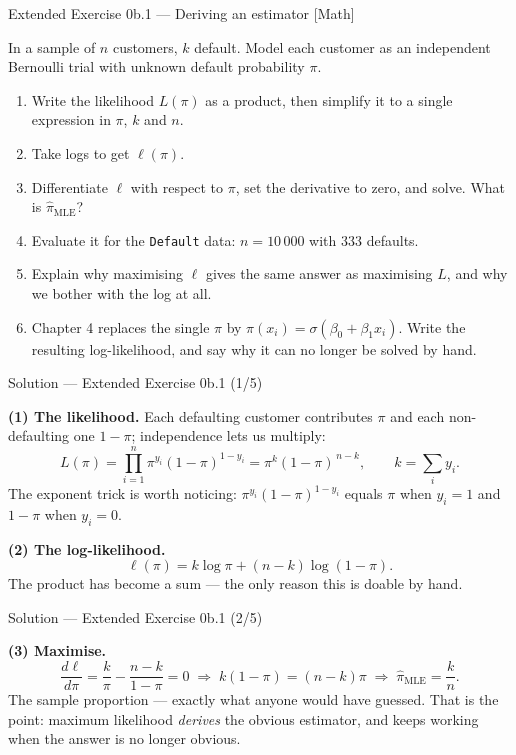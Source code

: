 \documentclass[aspectratio=169,11pt]{beamer}
\begin{document}
\begin{frame}{Extended Exercise 0b.1 --- Deriving an estimator [Math]}
  \begin{longexercise}
    In a sample of $n$ customers, $k$ default. Model each customer as an
    independent Bernoulli trial with unknown default probability $\pi$.
    \begin{enumerate}
      \item Write the likelihood $L(\pi)$ as a product, then simplify it to a
            single expression in $\pi$, $k$ and $n$.
      \item Take logs to get $\ell(\pi)$.
      \item Differentiate $\ell$ with respect to $\pi$, set the derivative to
            zero, and solve. What is $\hat\pi_{\mathrm{MLE}}$?
      \item Evaluate it for the \texttt{Default} data: $n = 10\,000$ with
            $333$ defaults.
      \item Explain why maximising $\ell$ gives the same answer as maximising
            $L$, and why we bother with the log at all.
      \item Chapter 4 replaces the single $\pi$ by
            $\pi(x_i) = \sigma(\beta_0 + \beta_1 x_i)$. Write the resulting
            log-likelihood, and say why it can no longer be solved by hand.
    \end{enumerate}
  \end{longexercise}
\end{frame}

\begin{frame}{Solution --- Extended Exercise 0b.1 (1/5)}
  \begin{solutionbox}
    \textbf{(1) The likelihood.} Each defaulting customer contributes $\pi$ and
    each non-defaulting one $1-\pi$; independence lets us multiply:
    \[
      L(\pi) = \prod_{i=1}^{n} \pi^{y_i}(1-\pi)^{1-y_i}
             = \pi^{k}(1-\pi)^{\,n-k},
      \qquad k = \sum_i y_i .
    \]
    The exponent trick is worth noticing: $\pi^{y_i}(1-\pi)^{1-y_i}$ equals
    $\pi$ when $y_i = 1$ and $1-\pi$ when $y_i = 0$.

    \textbf{(2) The log-likelihood.}
    \[
      \ell(\pi) = k\log \pi + (n-k)\log(1-\pi).
    \]
    The product has become a sum --- the only reason this is doable by hand.
  \end{solutionbox}
\end{frame}

\begin{frame}{Solution --- Extended Exercise 0b.1 (2/5)}
  \begin{solutionbox}
    \textbf{(3) Maximise.}
    \[
      \frac{d\ell}{d\pi} = \frac{k}{\pi} - \frac{n-k}{1-\pi} = 0
      \;\Longrightarrow\;
      k(1-\pi) = (n-k)\pi
      \;\Longrightarrow\;
      \hat\pi_{\mathrm{MLE}} = \frac{k}{n}.
    \]
    The sample proportion --- exactly what anyone would have guessed. That is
    the point: maximum likelihood \emph{derives} the obvious estimator, and
    keeps working when the answer is no longer obvious.
  \end{solutionbox}
\end{frame}
\end{document}
